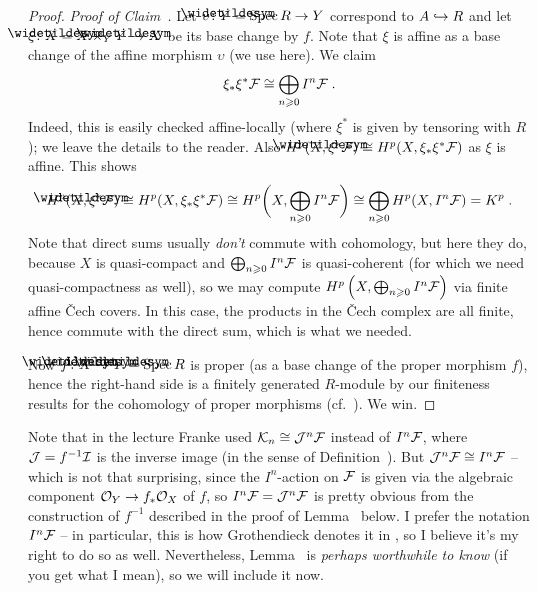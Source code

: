 \documentclass[a4paper,parskip=half,numbers=enddot, DIV=12]{scrreprt}
\renewcommand{\geq}{\geqslant}
\begin{document}
\begin{proof}
	\emph{Proof of Claim~.} Let $\upsilon\colon\snake{Y}=\Spec R\morphism Y$ correspond to $A\monomorphism R$ and let $\xi\colon \snake{X}=X\times_Y\snake{Y}\morphism X$ be its base change by $f$. Note that $\xi$ is affine as a base change of the affine morphism $\upsilon$ (we use \cite[Corollary~2.5.1]{alggeo1} here). We claim
	\begin{align*}
		\xi_*\xi^*\Ff\cong\bigoplus_{n\geq 0}I^n\Ff\;.
	\end{align*}
	Indeed, this is easily checked affine-locally (where $\xi^*$ is given by tensoring with $R$); we leave the details to the reader. Also $H^p(\snake{X},\xi^*\Ff)\cong H^p(X,\xi_*\xi^*\Ff)$ as $\xi$ is affine. This shows
	\begin{align*}
		H^p(\snake{X},\xi^*\Ff)\cong H^p(X,\xi_*\xi^*\Ff)\cong H^p\bigg(X,\bigoplus_{n\geq 0}I^n\Ff\bigg)\cong \bigoplus_{n\geq 0}H^p(X,I^n\Ff)=K^p\;.
	\end{align*}
	Note that direct sums usually \emph{don't} commute with cohomology, but here they do, because $X$ is quasi-compact and $\bigoplus_{n\geq 0}I^n\Ff$ is quasi-coherent (for which we need quasi-compactness as well), so we may compute $H^p\left(X,\bigoplus_{n\geq 0}I^n\Ff\right)$ via finite affine \v Cech covers. In this case, the products in the \v Cech complex are all finite, hence commute with the direct sum, which is what we needed.
	
	Now $\snake{f}\colon \snake{X}\morphism\snake{Y}=\Spec R$ is proper (as a base change of the proper morphism $f$), hence the right-hand side is a finitely generated $R$-module by our finiteness results for the cohomology of proper morphisms (cf.\ \cite[Theorem~5]{alggeo2}). We win.
\end{proof}
\begin{rem}
	Note that in the lecture Franke used $\mathcal{K}_n\cong \mathcal{J}^n\mathcal{F}$ instead of $I^n\mathcal{F}$, where $\mathcal{J}=f^{-1}\mathcal{I}$ is the inverse image (in the sense of Definition~). But $\mathcal{J}^n\mathcal{F}\cong I^n\mathcal{F}$ -- which is not that surprising, since the $I^n$-action on $\mathcal{F}$ is given via the algebraic component $\Oo_Y\morphism f_*\Oo_X$ of $f$, so $I^n\mathcal{F}=\mathcal{J}^n\mathcal{F}$ is pretty obvious from the construction of $f^{-1}$ described in the proof of Lemma~ below. I prefer the notation $I^n\mathcal{F}$ -- in particular, this is how Grothendieck denotes it in \cite[Ch.\:III (4.1.7)]{egaIII}, so I believe it's my right to do so as well. Nevertheless, Lemma~ is \emph{perhaps worthwhile to know} (if you get what I mean), so we will include it now.
\end{rem}
\end{document}
